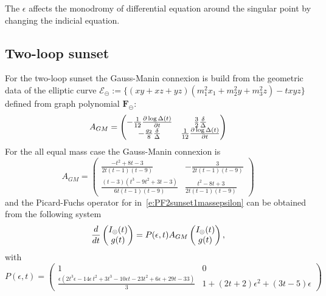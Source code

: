 \documentclass[a4paper,12pt]{article}
\numberwithin{equation}{section}
\numberwithin{figure}{section}
\def\su{\circleddash}
\begin{document}
The  $\epsilon$ affects the monodromy of differential equation around
the singular point by changing the indicial equation.





\subsection{Two-loop sunset}

For the two-loop sunset the Gauss-Manin connexion is build from the
geometric data of the elliptic curve
$\mathscr{E}_\su:=\{(xy+xz+yz)(m_1^2x_1+m_2^2y+m_3^2z)-t xyz\}$
defined from graph polynomial $\textbf{F}_\su$:
\begin{equation}
  \label{eq:AGM}
  A_{GM}=
  \begin{pmatrix}
    -{1\over 12}{\partial \log\Delta(t)\over \partial t} &{3\over
      2}{\delta\over \Delta}\cr
    -{g_2\over8}{\delta\over\Delta}&{1\over12}{\partial\log\Delta(t)\over\partial t}
  \end{pmatrix}
\end{equation}
For the all equal mass case the Gauss-Manin connexion is
\begin{equation}
  \label{eq:AGM2sunset1mass}
  A_{GM}=\begin{pmatrix}
\frac{-t^{2}+8 t -3}{2 t \left(t -1\right) \left(t -9\right)} & -\frac{3}{2 t \left(t -1\right) \left(t -9\right)} 
\\
 \frac{\left(t -3\right) \left(t^{3}-9 t^{2}+3 t -3\right)}{6 t \left(t -1\right) \left(t -9\right)} & \frac{t^{2}-8 t +3}{2 t \left(t -1\right) \left(t -9\right)} 
\end{pmatrix}
\end{equation}
and the
Picard-Fuchs operator for
in~\eqref{e:PF2sunset1massepsilon} can be obtained from the following
system
\begin{equation}
  {d\over dt}
  \begin{pmatrix}
    I_\su(t)\cr g(t)
  \end{pmatrix} =P(\epsilon,t) A_{GM} \begin{pmatrix}
    I_\su(t)\cr g(t)
  \end{pmatrix},
\end{equation}
with
\begin{equation}
  P(\epsilon,t)=
  \begin{pmatrix}
    1 & 0 
\\
 \frac{\epsilon  \left(2 t^{3} \epsilon -14 \epsilon  \,t^{2}+3 t^{3}-10 \epsilon  t -23 t^{2}+6 \epsilon +29 t -33\right)}{3} & 1+\left(2 t +2\right) \epsilon^{2}+\left(3 t -5\right) \epsilon  
  \end{pmatrix}
\end{equation}
\end{document}
